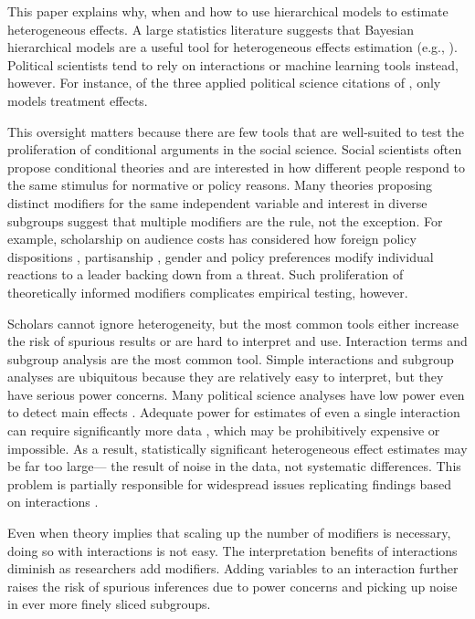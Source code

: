 \documentclass[12pt]{article}
\begin{document}
This paper explains why, when and how to use hierarchical models to estimate heterogeneous effects. 
A large statistics literature suggests that Bayesian hierarchical models are a useful tool for  heterogeneous effects estimation (e.g., \cite{FellerGelman2015, McElreath2016, Dorieetal2022}).
Political scientists tend to rely on interactions or machine learning tools instead, however.  
For instance, of the three applied political science citations of \citet{FellerGelman2015}, only \citet{Marquardt2022} models treatment effects. 


This oversight matters because there are few tools that are well-suited to test the proliferation of conditional arguments in the social science. 
Social scientists often propose conditional theories \citep{ClarkGolder2023} and are interested in how different people respond to the same stimulus for normative or policy reasons.
Many theories proposing distinct modifiers for the same independent variable and interest in diverse subgroups suggest that multiple modifiers are the rule, not the exception.  
For example, scholarship on audience costs has considered how foreign policy dispositions \citep{KertzerBrutger2016}, partisanship \citep{LevenduskyHorowitz2012}, gender \citep{Barnhartetal2020, SchwartzBlair2020} and policy preferences \citep{Chaudoin2014} modify individual reactions to a leader backing down from a threat.
Such proliferation of theoretically informed modifiers complicates empirical testing, however. 


Scholars cannot ignore heterogeneity, but the most common tools either increase the risk of spurious results or are hard to interpret and use. 
Interaction terms and subgroup analysis are the most common tool. 
Simple interactions and subgroup analyses are ubiquitous because they are relatively easy to interpret, but they have serious power concerns. 
Many political science analyses have low power even to detect main effects \citep{ArelBundocketal2022}.
Adequate power for estimates of even a single interaction can require significantly more data \citep{Gelman2018}, which may be prohibitively expensive or impossible.
As a result, statistically significant heterogeneous effect estimates may be far too large--- the result of noise in the data, not systematic differences. 
This problem is partially responsible for widespread issues replicating findings based on interactions \citep{Simmonsetal2011}. 


Even when theory implies that scaling up the number of modifiers is necessary, doing so with interactions is not easy. 
The interpretation benefits of interactions diminish as researchers add modifiers.
Adding variables to an interaction further raises the risk of spurious inferences due to power concerns and picking up noise in ever more finely sliced subgroups.
\end{document}
